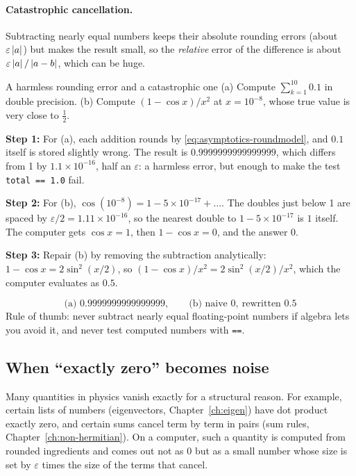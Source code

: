 \paragraph{Catastrophic cancellation.} Subtracting nearly equal numbers keeps their absolute rounding errors (about $\varepsilon\left\lvert a\right\rvert$) but makes the result small, so the \emph{relative} error of the difference is about $\varepsilon\left\lvert a\right\rvert/\left\lvert a-b\right\rvert$, which can be huge.

\begin{sample}{A harmless rounding error and a catastrophic one}
(a) Compute $\sum_{k=1}^{10}0.1$ in double precision. (b) Compute $(1-\cos x)/x^2$ at $x=10^{-8}$, whose true value is very close to $\tfrac12$.

\textbf{Step 1:} For (a), each addition rounds by \cref{eq:asymptotics-roundmodel}, and $0.1$ itself is stored slightly wrong. The result is $0.9999999999999999$, which differs from 1 by $1.1\times10^{-16}$, half an $\varepsilon$: a harmless error, but enough to make the test \texttt{total == 1.0} fail.

\textbf{Step 2:} For (b), $\cos(10^{-8})=1-5\times10^{-17}+\dots$. The doubles just below 1 are spaced by $\varepsilon/2=1.11\times10^{-16}$, so the nearest double to $1-5\times10^{-17}$ is $1$ itself. The computer gets $\cos x=1$, then $1-\cos x=0$, and the answer $0$.

\textbf{Step 3:} Repair (b) by removing the subtraction analytically: $1-\cos x=2\sin^2(x/2)$, so $(1-\cos x)/x^2=2\sin^2(x/2)/x^2$, which the computer evaluates as $0.5$.

\[
\boxed{\text{(a) }0.9999999999999999,\qquad\text{(b) naive }0,\ \text{rewritten }0.5}
\]
Rule of thumb: never subtract nearly equal floating-point numbers if algebra lets you avoid it, and never test computed numbers with \texttt{==}.
\end{sample}

\subsection{When ``exactly zero'' becomes noise}

Many quantities in physics vanish exactly for a structural reason. For example, certain lists of numbers (eigenvectors, Chapter~\ref{ch:eigen}) have dot product exactly zero, and certain sums cancel term by term in pairs (sum rules, Chapter~\ref{ch:non-hermitian}). On a computer, such a quantity is computed from rounded ingredients and comes out not as 0 but as a small number whose size is set by $\varepsilon$ times the size of the terms that cancel.

